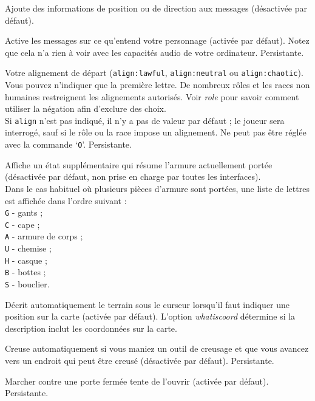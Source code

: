 \documentclass[titlepage]{article}
\begin{document}
\begin{description}[font=\mdseries\itshape]
\item[accessiblemsg]
Ajoute des informations de position ou de direction aux messages (désactivée par défaut).
\item[acoustics]
Active les messages sur ce qu'entend votre personnage (activée par défaut).
Notez que cela n'a rien à voir avec les capacités audio de votre ordinateur.
Persistante.
\item[alignment]
Votre alignement de départ (\texttt{align:lawful}, \texttt{align:neutral}
ou \texttt{align:chaotic}).
Vous pouvez n'indiquer que la première lettre.
De nombreux rôles et les races non humaines restreignent les alignements autorisés.
Voir \textit{role}
pour savoir comment utiliser la négation afin d'exclure des choix.
\\
Si \texttt{align} n'est pas indiqué, il n'y a pas de valeur par défaut ;
le joueur sera interrogé, sauf si le rôle ou la race impose un alignement.
Ne peut pas être réglée avec la commande `\texttt{O}'. Persistante.
\item[armorstatus]
Affiche un état supplémentaire qui résume l'armure actuellement portée
(désactivée par défaut, non prise en charge par toutes les interfaces).
\\
Dans le cas habituel où plusieurs pièces d'armure sont portées, une liste de
lettres est affichée dans l'ordre suivant :
\\
\texttt{G} - gants ;\\
\texttt{C} - cape ;\\
\texttt{A} - armure de corps ;\\
\texttt{U} - chemise ;\\
\texttt{H} - casque ;\\
\texttt{B} - bottes ;\\
\texttt{S} - bouclier.
\item[autodescribe]
Décrit automatiquement le terrain sous le curseur lorsqu'il faut indiquer une position
sur la carte (activée par défaut).
L'option \textit{whatis\textunderscore coord}
détermine si la description inclut les coordonnées sur la carte.
\item[autodig]
Creuse automatiquement si vous maniez un outil de creusage et que vous avancez vers un endroit
qui peut être creusé (désactivée par défaut). Persistante.
\item[autoopen]
Marcher contre une porte fermée tente de l'ouvrir (activée par défaut).
Persistante.

\end{description}
\end{document}
